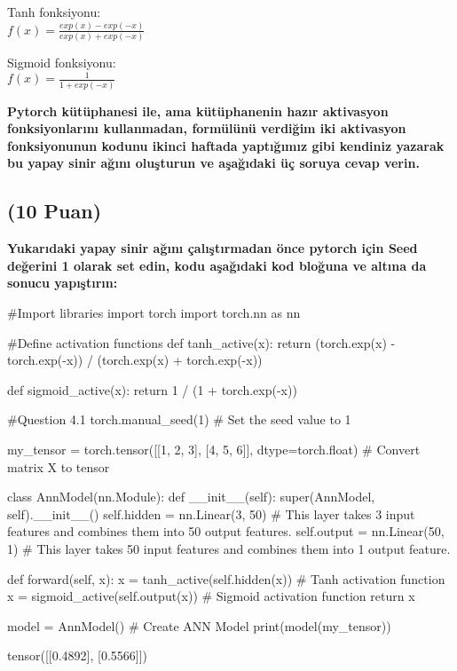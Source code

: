 \documentclass[11pt]{article}
\begin{document}
Tanh fonksiyonu:\\
$f(x) = \frac{exp(x) - exp(-x)}{exp(x) + exp(-x)}$
\vspace{.2in}

Sigmoid fonksiyonu:\\
$f(x) = \frac{1}{1 + exp(-x)}$

\vspace{.2in}
 \textbf{Pytorch kütüphanesi ile, ama kütüphanenin hazır aktivasyon fonksiyonlarını kullanmadan, formülünü verdiğim iki aktivasyon fonksiyonunun kodunu ikinci haftada yaptığımız gibi kendiniz yazarak bu yapay sinir ağını oluşturun ve aşağıdaki üç soruya cevap verin.}
 
\subsection{(10 Puan)} \textbf{Yukarıdaki yapay sinir ağını çalıştırmadan önce pytorch için Seed değerini 1 olarak set edin, kodu aşağıdaki kod bloğuna ve altına da sonucu yapıştırın:}

\begin{python}
#Import libraries
import torch
import torch.nn as nn

#Define activation functions
def tanh_active(x):
    return (torch.exp(x) - torch.exp(-x)) / (torch.exp(x) + torch.exp(-x))

def sigmoid_active(x):
    return 1 / (1 + torch.exp(-x))

#Question 4.1
torch.manual_seed(1)  # Set the seed value to 1

my_tensor = torch.tensor([[1, 2, 3], [4, 5, 6]], dtype=torch.float)  # Convert matrix X to tensor

class AnnModel(nn.Module):
    def __init__(self):
        super(AnnModel, self).__init__()
        self.hidden = nn.Linear(3, 50)  # This layer takes 3 input features and combines them into 50 output features.
        self.output = nn.Linear(50, 1)  # This layer takes 50 input features and combines them into 1 output feature.

    def forward(self, x):
        x = tanh_active(self.hidden(x))  # Tanh activation function
        x = sigmoid_active(self.output(x))  # Sigmoid activation function
        return x

model = AnnModel()  # Create ANN Model
print(model(my_tensor))
\end{python}

tensor([[0.4892],
        [0.5566]])
\end{document}
